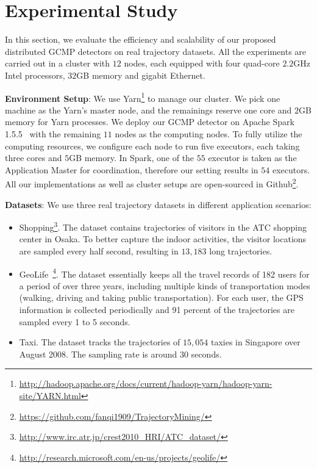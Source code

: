 \section{Experimental Study}
\label{sec:exp}
In this section, we evaluate the efficiency and scalability of our proposed distributed GCMP detectors on real trajectory datasets. All the experiments are carried out in a cluster with $12$ nodes, each equipped with four quad-core $2.2$GHz Intel processors, $32$GB memory and gigabit Ethernet. 

\textbf{Environment Setup}: We use Yarn\footnote{\url{http://hadoop.apache.org/docs/current/hadoop-yarn/hadoop-yarn-site/YARN.html}} to manage our cluster. We pick one machine as the Yarn's master node, and the remainings reserve one core and $2$GB memory for Yarn processes. We deploy our GCMP detector on Apache Spark 1.5.5~\cite{zaharia2012resilient} with the remaining $11$ nodes as the computing nodes.
To fully utilize the computing resources, we configure each node to run five executors, each taking three cores and $5$GB memory. In Spark, one of the $55$ executor is taken as the Application Master for coordination, therefore our setting results in $54$ executors.
All our implementations as well as cluster setups are open-sourced in Github\footnote{\url{https://github.com/fanqi1909/TrajectoryMining/}}.

\textbf{Datasets}: We use three real trajectory datasets in different application scenarios:
\begin{itemize}
\item{Shopping}\footnote{\url{http://www.irc.atr.jp/crest2010_HRI/ATC_dataset/}}. The dataset contains
  trajectories of visitors in the ATC shopping center in Osaka. To better capture the indoor activities, the visitor locations are sampled every half second, resulting in $13,183$ long trajectories. 
\item{GeoLife}~\footnote{\url{http://research.microsoft.com/en-us/projects/geolife/}}. The dataset essentially keeps all the travel records of 182 users for a period
of over three years, including multiple kinds of transportation modes (walking, driving and taking public
transportation). For each user, the GPS information is collected periodically and 91 percent of the trajectories
are sampled every 1 to 5 seconds.
\item{Taxi}. The dataset tracks the trajectories of $15,054$ taxies in Singapore over August 2008. The sampling
rate is around 30 seconds. 
\end{itemize}


